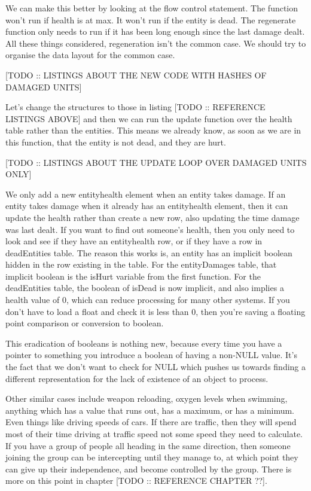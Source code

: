 \documentclass[a4paper,12pt]{book}
\begin{document}
We can make this better by looking at the flow control statement.
The function won't run if health is at max.
It won't run if the entity is dead.
The regenerate function only needs to run if it has been long enough since the last damage dealt.
All these things considered, regeneration isn't the common case.
We should try to organise the data layout for the common case.

[TODO :: LISTINGS ABOUT THE NEW CODE WITH HASHES OF DAMAGED UNITS]

Let's change the structures to those in listing [TODO :: REFERENCE LISTINGS ABOVE] and then we can run the update function over the health table rather than the entities.
This means we already know, as soon as we are in this function, that the entity is not dead, and they are hurt.

[TODO :: LISTINGS ABOUT THE UPDATE LOOP OVER DAMAGED UNITS ONLY]

We only add a new entityhealth element when an entity takes damage.
If an entity takes damage when it already has an entityhealth element, then it can update the health rather than create a new row, also updating the time damage was last dealt.
If you want to find out someone's health, then you only need to look and see if they have an entityhealth row, or if they have a row in deadEntities table.
The reason this works is, an entity has an implicit boolean hidden in the row existing in the table.
For the entityDamages table, that implicit boolean is the isHurt variable from the first function.
For the deadEntities table, the boolean of isDead is now implicit, and also implies a health value of 0, which can reduce processing for many other systems.
If you don't have to load a float and check it is less than 0, then you're saving a floating point comparison or conversion to boolean.

This eradication of booleans is nothing new, because every time you have a pointer to something you introduce a boolean of having a non-NULL value.
It's the fact that we don't want to check for NULL which pushes us towards finding a different representation for the lack of existence of an object to process.

Other similar cases include weapon reloading, oxygen levels when swimming, anything which has a value that runs out, has a maximum, or has a minimum.
Even things like driving speeds of cars.
If there are traffic, then they will spend most of their time driving at traffic speed not some speed they need to calculate.
If you have a group of people all heading in the same direction, then someone joining the group can be intercepting until they manage to, at which point they can give up their independence, and become controlled by the group.
There is more on this point in chapter [TODO :: REFERENCE CHAPTER ??].
\end{document}
